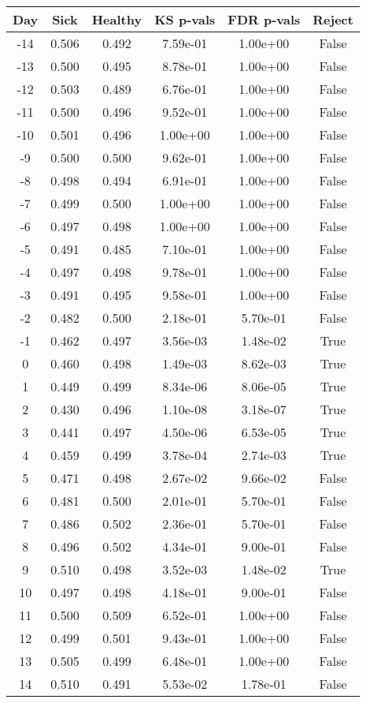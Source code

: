 \begin{tabular}{c|c|c|c|c|c}
Day &  Sick & Healthy &  KS p-vals & FDR p-vals & Reject\\
\hline
-14 & 0.506 &   0.492 &   7.59e-01 &   1.00e+00 &  False\\
-13 & 0.500 &   0.495 &   8.78e-01 &   1.00e+00 &  False\\
-12 & 0.503 &   0.489 &   6.76e-01 &   1.00e+00 &  False\\
-11 & 0.500 &   0.496 &   9.52e-01 &   1.00e+00 &  False\\
-10 & 0.501 &   0.496 &   1.00e+00 &   1.00e+00 &  False\\
 -9 & 0.500 &   0.500 &   9.62e-01 &   1.00e+00 &  False\\
 -8 & 0.498 &   0.494 &   6.91e-01 &   1.00e+00 &  False\\
 -7 & 0.499 &   0.500 &   1.00e+00 &   1.00e+00 &  False\\
 -6 & 0.497 &   0.498 &   1.00e+00 &   1.00e+00 &  False\\
 -5 & 0.491 &   0.485 &   7.10e-01 &   1.00e+00 &  False\\
 -4 & 0.497 &   0.498 &   9.78e-01 &   1.00e+00 &  False\\
 -3 & 0.491 &   0.495 &   9.58e-01 &   1.00e+00 &  False\\
 -2 & 0.482 &   0.500 &   2.18e-01 &   5.70e-01 &  False\\
 -1 & 0.462 &   0.497 &   3.56e-03 &   1.48e-02 &   True\\
  0 & 0.460 &   0.498 &   1.49e-03 &   8.62e-03 &   True\\
  1 & 0.449 &   0.499 &   8.34e-06 &   8.06e-05 &   True\\
  2 & 0.430 &   0.496 &   1.10e-08 &   3.18e-07 &   True\\
  3 & 0.441 &   0.497 &   4.50e-06 &   6.53e-05 &   True\\
  4 & 0.459 &   0.499 &   3.78e-04 &   2.74e-03 &   True\\
  5 & 0.471 &   0.498 &   2.67e-02 &   9.66e-02 &  False\\
  6 & 0.481 &   0.500 &   2.01e-01 &   5.70e-01 &  False\\
  7 & 0.486 &   0.502 &   2.36e-01 &   5.70e-01 &  False\\
  8 & 0.496 &   0.502 &   4.34e-01 &   9.00e-01 &  False\\
  9 & 0.510 &   0.498 &   3.52e-03 &   1.48e-02 &   True\\
 10 & 0.497 &   0.498 &   4.18e-01 &   9.00e-01 &  False\\
 11 & 0.500 &   0.509 &   6.52e-01 &   1.00e+00 &  False\\
 12 & 0.499 &   0.501 &   9.43e-01 &   1.00e+00 &  False\\
 13 & 0.505 &   0.499 &   6.48e-01 &   1.00e+00 &  False\\
 14 & 0.510 &   0.491 &   5.53e-02 &   1.78e-01 &  False\\
\end{tabular}